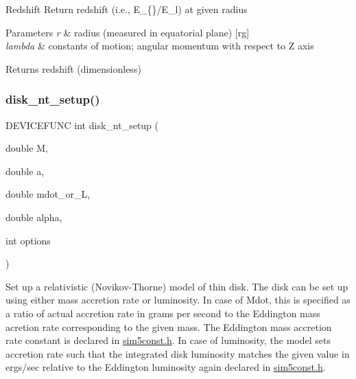 Redshift Return redshift (i.\+e., E\+\_\+\{\}/\+E\+\_\+l) at given radius


\begin{DoxyParams}{Parameters}
{\em r} & radius (measured in equatorial plane) \mbox{[}rg\mbox{]} \\
\hline
{\em lambda} & constants of motion; angular momentum with respect to Z axis\\
\hline
\end{DoxyParams}
\begin{DoxyReturn}{Returns}
redshift (dimensionless) 
\end{DoxyReturn}
\mbox{\label{sim5disk-nt_8c_a0d21c45c6cae4ab611409f661d6031e4}} 
\subsubsection{\texorpdfstring{disk\+\_\+nt\+\_\+setup()}{disk\_nt\_setup()}}
{\footnotesize\ttfamily D\+E\+V\+I\+C\+E\+F\+U\+NC int disk\+\_\+nt\+\_\+setup (\begin{DoxyParamCaption}\item[{double}]{M,  }\item[{double}]{a,  }\item[{double}]{mdot\+\_\+or\+\_\+L,  }\item[{double}]{alpha,  }\item[{int}]{options }\end{DoxyParamCaption})}

Set up a relativistic (Novikov-\/\+Thorne) model of thin disk. The disk can be set up using either mass accretion rate or luminosity. In case of Mdot, this is specified as a ratio of actual accretion rate in grams per second to the Eddington mass acretion rate corresponding to the given mass. The Eddington mass accretion rate constant is declared in \hyperlink{sim5const_8h}{sim5const.\+h}. In case of luminosity, the model sets accretion rate such that the integrated disk luminosity matches the given value in ergs/sec relative to the Eddington luminosity again declared in \hyperlink{sim5const_8h}{sim5const.\+h}.


